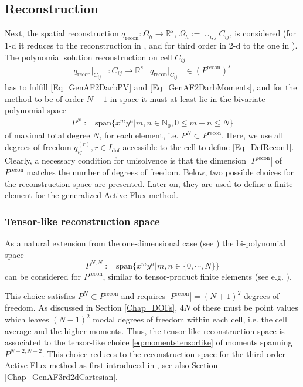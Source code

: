 \documentclass[12pt,a4paper]{article}
\begin{document}
\subsection{Reconstruction}
\label{Chap_GenAF2DReconstruction}
Next, the spatial reconstruction \(q_\mathrm{recon}: \Omega_h \rightarrow \mathbb R^s\), \(\Omega_h:= \cup_{i,j} C_{ij}\), is considered (for 1-d it reduces to the reconstruction in \cite{AB2023FEFV}, and for third order in 2-d to the one in \cite{BHKR2019}).
The polynomial solution reconstruction on cell \(C_{ij}\) 
\begin{align}\label{Eq_DefRecon1}
	q_\mathrm{recon}|_{C_{ij}}&\colon C_{ij} \rightarrow \mathbb R^s & q_\mathrm{recon}|_{C_{ij}} & \in (P^\mathrm{recon})^s
\end{align}
has to fulfill \eqref{Eq_GenAF2DarbPV} and \eqref{Eq_GenAF2DarbMoments}, 
and for the method to be of order $N+1$ in space it must at least lie in the bivariate polynomial space 
\begin{align}
P^N:=\mathrm{span}\{x^m y^n | m, n \in \mathbb N_0, 0 \leq m+n \leq N\}
\end{align}
of maximal total degree $N$, for each element, i.e. \(P^N \subset P^\mathrm{recon}\). 
Here, we use all degrees of freedom \(q_{ij}^{(r)}, r \in I_\mathrm{dof}\) accessible to the cell to define \eqref{Eq_DefRecon1}. Clearly, a necessary condition for unisolvence is that the dimension $|P^\mathrm{recon}|$ of $P^\mathrm{recon}$ matches the number of degrees of freedom. 
Below, two possible choices for the reconstruction space are presented. Later on, they are used to define a finite element for the generalized Active Flux method.



\subsubsection{Tensor-like reconstruction space}
As a natural extension from the one-dimensional case (see \cite{AB2023FEFV,AB2023ExtensionAF}) the bi-polynomial space
\begin{equation}
	P^{N,N}:= \mathrm{span}\{x^m y^n | m,n \in \{0, \cdots, N\}\}
\end{equation}
can be considered for \(P^\mathrm{recon}\), similar to tensor-product finite elements (see e.g. \cite[Chapter~6.4]{ErnGuermond2021}).

This choice satisfies \(P^N \subset P^\mathrm{recon}\) and requires \(|P^\mathrm{recon}|=(N+1)^2\) degrees of freedom. As discussed in Section \ref{Chap_DOFs}, $4N$ of these must be point values which leaves $(N-1)^2$ modal degrees of freedom within each cell, i.e. the cell average and the higher moments. Thus, the tensor-like reconstruction space is associated to the tensor-like choice \eqref{eq:momentstensorlike} of moments spanning \(P^{N-2,N-2}\). This choice reduces to the reconstruction space for the third-order Active Flux method as first introduced in \cite{BHKR2019,Helzel2019}, see also Section \ref{Chap_GenAF3rd2dCartesian}.\\
\end{document}
